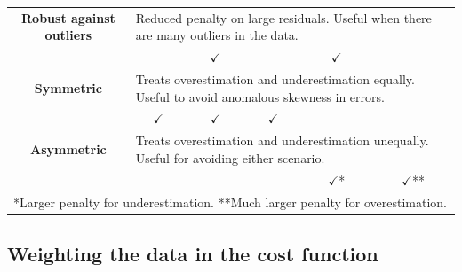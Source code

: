 {\begin{landscape}
\begin{table}[]
\begin{tabular}{@{}lcccccc@{}}
    \multicolumn{2}{c}{\textbf{Robust against outliers}} & \multicolumn{5}{l}{Reduced penalty on large residuals. Useful when there are many outliers in the data.} \\
    \multicolumn{2}{c}{\textbf{}}       &       & $\checkmark$                                                                     &                                                              & $\checkmark$                                                                                        &                                                                              \\ \midrule
    \multicolumn{2}{c}{\textbf{Symmetric}} & \multicolumn{5}{l}{Treats overestimation and underestimation equally. Useful to avoid anomalous skewness in errors.} \\
    \multicolumn{2}{c}{\textbf{}} & $\checkmark$                                                          & $\checkmark$                                                                     & $\checkmark$                                                             &                                                                                                     &                                                                            \\ %
    \multicolumn{2}{c}{\textbf{Asymmetric}} & \multicolumn{5}{l}{Treats overestimation and underestimation unequally. Useful for avoiding either scenario.} \\
    \multicolumn{2}{c}{\textbf{}} & \multicolumn{1}{l}{}                                                  &                                                             & \multicolumn{1}{l}{}                                                     & $\checkmark$*                         & $\checkmark$**              \\ \bottomrule
    \multicolumn{7}{l}{*Larger penalty for underestimation. **Much larger penalty for overestimation.}
    \end{tabular}
    \end{table}
\end{landscape}
\clearpage%
}

\subsection{Weighting the data in the cost function} \label{subsection-met-weight}

